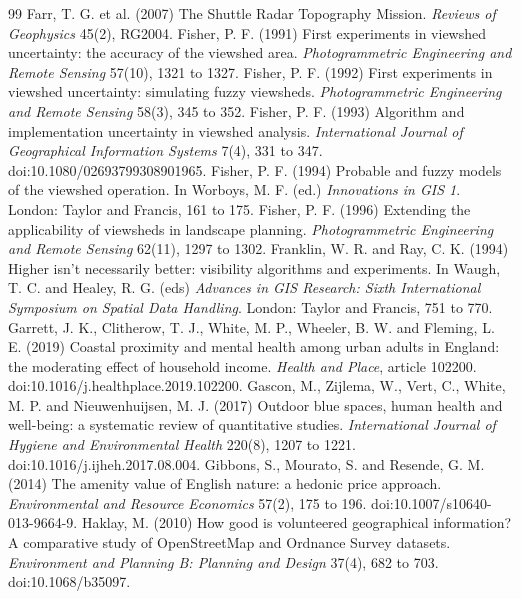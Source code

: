 \begin{thebibliography}{99}
 Farr, T. G. et al. (2007) The Shuttle Radar Topography Mission. \textit{Reviews of Geophysics} 45(2), RG2004.
 Fisher, P. F. (1991) First experiments in viewshed uncertainty: the accuracy of the viewshed area. \textit{Photogrammetric Engineering and Remote Sensing} 57(10), 1321 to 1327.
 Fisher, P. F. (1992) First experiments in viewshed uncertainty: simulating fuzzy viewsheds. \textit{Photogrammetric Engineering and Remote Sensing} 58(3), 345 to 352.
 Fisher, P. F. (1993) Algorithm and implementation uncertainty in viewshed analysis. \textit{International Journal of Geographical Information Systems} 7(4), 331 to 347. doi:10.1080/02693799308901965.
 Fisher, P. F. (1994) Probable and fuzzy models of the viewshed operation. In Worboys, M. F. (ed.) \textit{Innovations in GIS 1}. London: Taylor and Francis, 161 to 175.
 Fisher, P. F. (1996) Extending the applicability of viewsheds in landscape planning. \textit{Photogrammetric Engineering and Remote Sensing} 62(11), 1297 to 1302.
 Franklin, W. R. and Ray, C. K. (1994) Higher isn't necessarily better: visibility algorithms and experiments. In Waugh, T. C. and Healey, R. G. (eds) \textit{Advances in GIS Research: Sixth International Symposium on Spatial Data Handling}. London: Taylor and Francis, 751 to 770.
 Garrett, J. K., Clitherow, T. J., White, M. P., Wheeler, B. W. and Fleming, L. E. (2019) Coastal proximity and mental health among urban adults in England: the moderating effect of household income. \textit{Health and Place}, article 102200. doi:10.1016/j.healthplace.2019.102200.
 Gascon, M., Zijlema, W., Vert, C., White, M. P. and Nieuwenhuijsen, M. J. (2017) Outdoor blue spaces, human health and well-being: a systematic review of quantitative studies. \textit{International Journal of Hygiene and Environmental Health} 220(8), 1207 to 1221. doi:10.1016/j.ijheh.2017.08.004.
 Gibbons, S., Mourato, S. and Resende, G. M. (2014) The amenity value of English nature: a hedonic price approach. \textit{Environmental and Resource Economics} 57(2), 175 to 196. doi:10.1007/s10640-013-9664-9.
 Haklay, M. (2010) How good is volunteered geographical information? A comparative study of OpenStreetMap and Ordnance Survey datasets. \textit{Environment and Planning B: Planning and Design} 37(4), 682 to 703. doi:10.1068/b35097.

\end{thebibliography}
